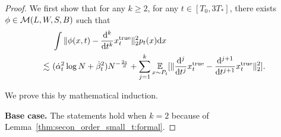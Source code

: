 \begin{proof}

    We first show that for any $k \geq 2$, for any $t \in [T_0, 3T_*]$, there exists $\phi \in {\cal M}(L,W,S,B)$ such that
    \begin{align}
    \label{eq:tmp_3}
    &~ \int \|\phi(x, t) - \frac{\mathrm{d}^k}{\mathrm{d} t^k}{x}_t^\mathrm{true}\|^2_2 p_t(x) \mathrm{d} x \notag \\
    \lesssim &~ 
    (\dot{\alpha}_t^2 \log N + \dot{\beta}_t^2 ) N^{- \frac{2s}{d}} +
    \sum_{j=1}^{k}\operatorname*{{\mathbb{E}}}_{x \sim P_t}[\|\frac{\mathrm{d}^{j}}{\mathrm{d} t^{j}}x_t^\mathrm{true} - \frac{\mathrm{d}^{j+1}}{\mathrm{d} t^{j+1}}x_t^\mathrm{true}\|_2^2].
    \end{align}

    We prove this by mathematical induction.

    \textbf{Base case.} The statements hold when $k = 2$ because of Lemma~\ref{thm:secon_order_small_t:formal}.


\end{proof}
